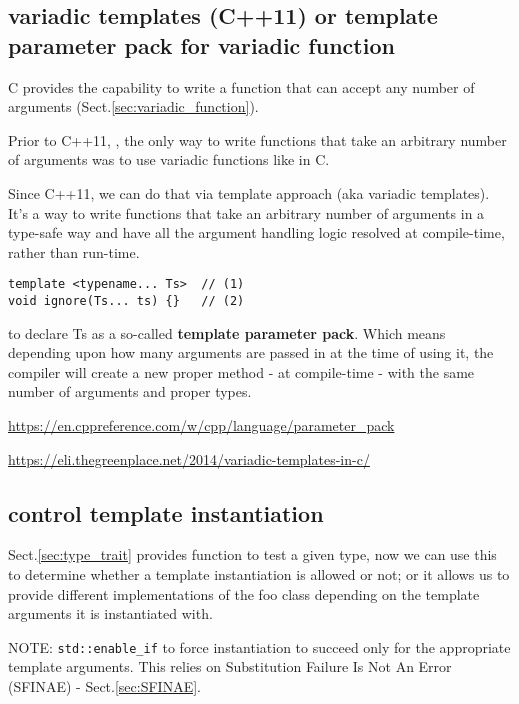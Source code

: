 \subsection{variadic templates (C++11) or template parameter pack for variadic function}
\label{sec:variadic-template}
\label{sec:template-arbitrary-number-of-arguments}
\label{sec:parameter-pack}

C provides the capability to write a function that can accept any number of
arguments (Sect.\ref{sec:variadic_function}).

Prior to C++11, , the only way to write functions that take an arbitrary number
of arguments was to use variadic functions like in C.

Since C++11, we can do that via template approach (aka variadic templates).
It's a way to write functions that take an arbitrary number of arguments in a
type-safe way and have all the argument handling logic resolved at compile-time,
rather than run-time.


\begin{verbatim}
template <typename... Ts>  // (1)
void ignore(Ts... ts) {}   // (2)
\end{verbatim}

to declare Ts as a so-called {\bf template parameter pack}. Which means
depending upon how many arguments are passed in at the time of using it, the
compiler will create a new proper method - at compile-time - with the same
number of arguments and proper types.

\url{https://en.cppreference.com/w/cpp/language/parameter_pack}


\url{https://eli.thegreenplace.net/2014/variadic-templates-in-c/}

\subsection{control template instantiation}
\label{sec:SFINAE-C++11}


Sect.\ref{sec:type_trait} provides function to test a given type, now we can use
this to determine whether a template instantiation is allowed or not; or it
allows us to provide different implementations of the foo class depending on the
template arguments it is instantiated with.


NOTE: \verb!std::enable_if! to force instantiation to succeed only for the
appropriate template arguments.
This relies on Substitution Failure Is Not An Error (SFINAE) - Sect.\ref{sec:SFINAE}.
 

